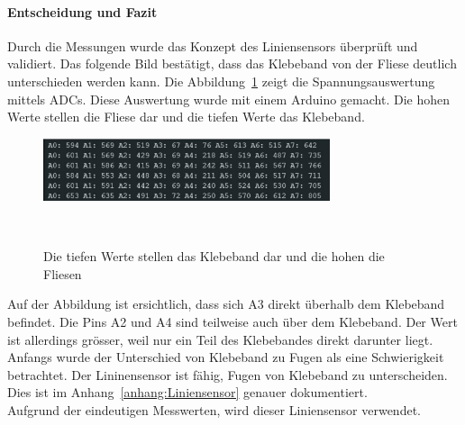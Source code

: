\documentclass[main.tex]{subfiles} %
\begin{document}
\paragraph{Entscheidung und Fazit}
Durch die Messungen wurde das 
Konzept des Liniensensors überprüft und validiert. Das folgende Bild bestätigt, dass das Klebeband
von der Fliese deutlich unterschieden werden kann. Die Abbildung~\ref{fig:Auswertung_Strecke_Beispiel} zeigt
die Spannungsauswertung mittels ADCs. Diese Auswertung wurde mit einem Arduino gemacht. Die hohen 
Werte stellen die Fliese dar und die tiefen Werte das Klebeband.

\begin{figure}[H]
    \centering
    \includegraphics[width=0.75\textwidth]{fig_Strecke_Tracken/Auswertung_Strecke.pdf}
    \caption{Die tiefen Werte stellen das Klebeband dar und die hohen die Fliesen}~\label{fig:Auswertung_Strecke_Beispiel}
\end{figure}

Auf der Abbildung ist ersichtlich, dass sich A3 direkt überhalb dem Klebeband befindet. Die Pins A2 und A4 sind 
teilweise auch über dem Klebeband. Der Wert ist allerdings grösser, weil nur ein Teil des Klebebandes direkt darunter
liegt.\\
Anfangs wurde der Unterschied von Klebeband zu Fugen als eine Schwierigkeit betrachtet. Der Lininensensor ist fähig, 
Fugen von Klebeband zu unterscheiden. Dies ist im Anhang~\ref{anhang:Liniensensor} genauer dokumentiert.\\
Aufgrund der eindeutigen Messwerten, wird dieser Liniensensor verwendet.
\end{document}
